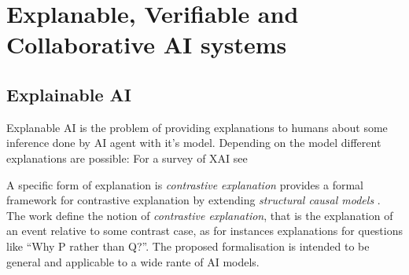 \section{Explanable, Verifiable and Collaborative AI systems} 

\subsection{Explainable AI} Explanable AI is the problem of providing
explanations to humans about some inference done by AI agent with it's
model. Depending on the model different explanations are possible:
For a survey of XAI see \cite{arrieta2020explainable}

A specific form of explanation is \emph{contrastive explanation}
\cite{miller2018contrastive} provides a formal framework for
contrastive explanation by extending \emph{structural causal models}
\cite{halpern2005causes1}.  The work define the notion of
\emph{contrastive explanation}, 
that is the explanation of an event relative to some contrast case, as
for instances explanations for questions like ``Why P rather than
Q?''. The proposed formalisation is intended to be general and
applicable to a wide rante of AI models.

